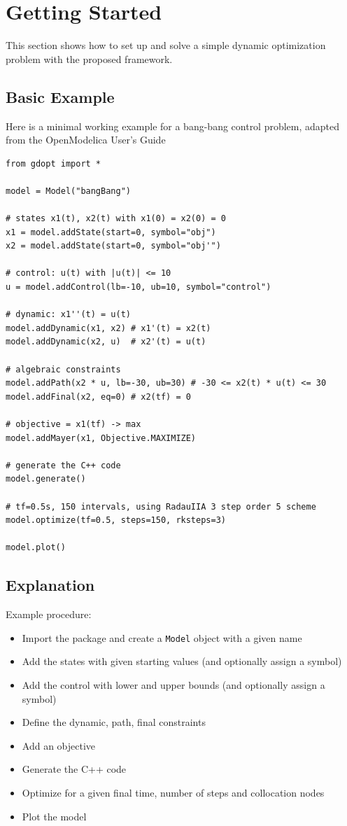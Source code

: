 \documentclass[12pt]{article}
\begin{document}
\section{Getting Started}
This section shows how to set up and solve a simple dynamic
optimization problem with the proposed framework.

\subsection{Basic Example}
Here is a minimal working example for a bang-bang control problem, adapted from
the OpenModelica User's Guide \cite{openmodelica}
\begin{lstlisting}
from gdopt import *

model = Model("bangBang")

# states x1(t), x2(t) with x1(0) = x2(0) = 0
x1 = model.addState(start=0, symbol="obj") 
x2 = model.addState(start=0, symbol="obj'")

# control: u(t) with |u(t)| <= 10
u = model.addControl(lb=-10, ub=10, symbol="control") 

# dynamic: x1''(t) = u(t)
model.addDynamic(x1, x2) # x1'(t) = x2(t)
model.addDynamic(x2, u)  # x2'(t) = u(t)

# algebraic constraints
model.addPath(x2 * u, lb=-30, ub=30) # -30 <= x2(t) * u(t) <= 30
model.addFinal(x2, eq=0) # x2(tf) = 0

# objective = x1(tf) -> max
model.addMayer(x1, Objective.MAXIMIZE) 

# generate the C++ code
model.generate() 

# tf=0.5s, 150 intervals, using RadauIIA 3 step order 5 scheme
model.optimize(tf=0.5, steps=150, rksteps=3)

model.plot()
	\end{lstlisting}

\subsection{Explanation}
Example procedure:
\begin{itemize}
	\item Import the package and create a \texttt{Model} object
	      with a given name
	\item Add the states with given starting values (and optionally
	      assign a symbol)
	\item Add the control with lower and upper bounds (and
	      optionally assign a symbol)
	\item Define the dynamic, path, final constraints
	\item Add an objective
	\item Generate the C++ code
	\item Optimize for a given final time, number of steps and
	      collocation nodes
	\item Plot the model
\end{itemize}
\end{document}
